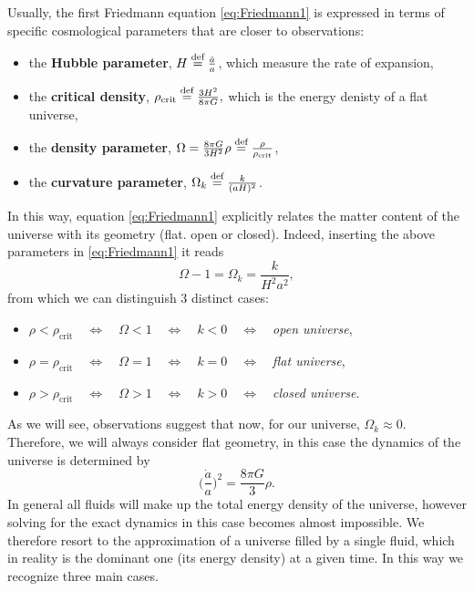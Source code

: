Usually, the first Friedmann equation \eqref{eq:Friedmann1} is expressed in terms of specific cosmological parameters that are closer to observations:
\begin{itemize}
    \item the \textbf{Hubble parameter}, $H\stackrel{\text{def}}{=}\frac{\dot a}{a}$, which measure the rate of expansion,
    \item the \textbf{critical density}, $\rho_{\text{crit}}\stackrel{\text{def}}{=}\frac{3H^2}{8\pi G},$ which is the energy denisty of a flat universe,
    \item the \textbf{density parameter}, $\Omega=\frac{8\pi G}{3H^2}\rho\stackrel{\text{def}}{=}\frac{\rho}{\rho_{\text{crit}}}$, 
    \item the \textbf{curvature parameter}, $\Omega_k\stackrel{\text{def}}{=}\frac{k}{(aH)^2}$.
\end{itemize}
In this way, equation \eqref{eq:Friedmann1} explicitly relates the matter content of the universe with its geometry (flat. open or closed). Indeed, inserting the above parameters in \eqref{eq:Friedmann1} it reads
\begin{equation}\label{eq:Friedmann_Omega}
    \Omega-1=\Omega_k=\frac{k}{H^2a^2},
\end{equation}
from which we can distinguish 3 distinct cases:
\begin{itemize}
    \item $\rho<\rho_{\text{crit}}\quad\Leftrightarrow\quad \Omega<1 \quad\Leftrightarrow\quad k<0 \quad\Leftrightarrow\quad $\emph{open universe},
    \item  $\rho=\rho_{\text{crit}}\quad\Leftrightarrow\quad \Omega=1 \quad\Leftrightarrow\quad k=0 \quad\Leftrightarrow\quad $\emph{flat universe},
    \item  $\rho>\rho_{\text{crit}}\quad\Leftrightarrow\quad \Omega>1 \quad\Leftrightarrow\quad k>0 \quad\Leftrightarrow\quad $\emph{closed universe}.
\end{itemize} 
As we will see, observations suggest that now, for our universe, $\Omega_k\approx0$. Therefore, we will always consider flat geometry, in this case the dynamics of the universe is determined by $$\bigg(\frac{\dot a }{a}\bigg)^2=\frac{8\pi G}{3}\rho. $$
In general all fluids will make up the total energy density of the universe, however solving for the exact dynamics in this case becomes almost impossible. We therefore resort to the approximation of a universe filled by a single fluid, which in reality is the dominant one (its energy density) at a given time. In this way we recognize three main cases. 
